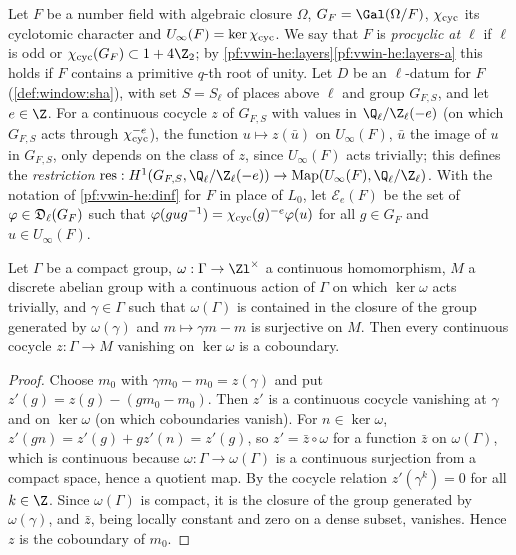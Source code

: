 Let $F$ be a number field with algebraic closure $\Omega$, $G_F=\Gal(\Omega/F)$, $\chi_{\mathrm{cyc}}$ its cyclotomic
character and $U_\infty(F)=\ker\chi_{\mathrm{cyc}}$. We say that $F$ is \emph{procyclic at $\ell$} if $\ell$ is odd or
$\vwinhecyc(G_F)\subset1+4\Z_2$; by \cref{pf:vwin-he:layers}\ref{pf:vwin-he:layers-a} this holds if $F$ contains a
primitive $q$-th root of unity. Let $D$ be an $\ell$-datum for $F$ (\cref{def:window:sha}), with set $S=S_\ell$ of
places above $\ell$ and group $G_{F,S}$, and let $e\in\Z$. For a continuous cocycle $z$ of $G_{F,S}$ with values in
$\vwinheQZ(-e)$ (on which $G_{F,S}$ acts through $\chi_{\mathrm{cyc}}^{-e}$), the function $u\mapsto z(\bar u)$ on
$U_\infty(F)$, $\bar u$ the image of $u$ in $G_{F,S}$, only depends on the class of $z$, since $U_\infty(F)$ acts
trivially; this defines the \emph{restriction} $\mathrm{res}:H^1(G_{F,S},\vwinheQZ(-e))\to\mathrm{Map}(U_\infty(F),\vwinheQZ)$.
With the notation of \cref{pf:vwin-he:dinf} for $F$ in place of $L_0$, let $\mathcal E_e(F)$ be the set of
$\varphi\in\mathfrak D_\ell(G_F)$ such that $\varphi(gug^{-1})=\chi_{\mathrm{cyc}}(g)^{-e}\varphi(u)$ for all $g\in G_F$ and
$u\in U_\infty(F)$.

\begin{lemma}\label{pf:vwin-he:cob}
Let $\Gamma$ be a compact group, $\omega:\Gamma\to\Zl^\times$ a continuous homomorphism, $M$ a discrete abelian group
with a continuous action of $\Gamma$ on which $\ker\omega$ acts trivially, and $\gamma\in\Gamma$ such that
$\omega(\Gamma)$ is contained in the closure of the group generated by $\omega(\gamma)$ and $m\mapsto\gamma m-m$ is
surjective on $M$. Then every continuous cocycle $z:\Gamma\to M$ vanishing on $\ker\omega$ is a coboundary.
\end{lemma}

\begin{proof}
Choose $m_0$ with $\gamma m_0-m_0=z(\gamma)$ and put $z'(g)=z(g)-(gm_0-m_0)$. Then $z'$ is a continuous cocycle
vanishing at $\gamma$ and on $\ker\omega$ (on which coboundaries vanish). For $n\in\ker\omega$,
$z'(gn)=z'(g)+gz'(n)=z'(g)$, so $z'=\bar z\circ\omega$ for a function $\bar z$ on $\omega(\Gamma)$, which is
continuous because $\omega:\Gamma\to\omega(\Gamma)$ is a continuous surjection from a compact space, hence a quotient
map. By the cocycle relation $z'(\gamma^k)=0$ for all $k\in\Z$. Since $\omega(\Gamma)$ is compact, it is the closure of
the group generated by $\omega(\gamma)$, and $\bar z$, being locally constant and zero on a dense subset, vanishes.
Hence $z$ is the coboundary of $m_0$.
\end{proof}

